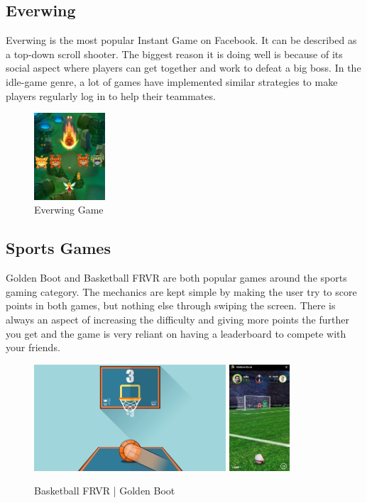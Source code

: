 \documentclass{article}
\begin{document}
\subsection{Everwing}
Everwing is the most popular Instant Game on Facebook. It can be described as a top-down scroll shooter. The biggest reason it is doing well is because of its social aspect where players can get together and work to defeat a big boss. In the idle-game genre, a lot of games have implemented similar strategies to make players regularly log in to help their teammates. 
\begin{figure}[h]
\centering
\includegraphics[width=100px]{images/everwing.png}
\caption{Everwing Game}
\end{figure}
\subsection{Sports Games}
Golden Boot and Basketball FRVR are both popular games around the sports gaming category. The mechanics are kept simple by making the user try to score points in both games, but nothing else through swiping the screen. There is always an aspect of increasing the difficulty and giving more points the further you get and the game is very reliant on having a leaderboard to compete with your friends.
\begin{figure}[h]
\centering
\includegraphics[height = 150px]{images/basketball.png}
\includegraphics[height = 150px]{images/goldenboot.png}
\caption{Basketball FRVR | Golden Boot}
\end{figure}
\end{document}
